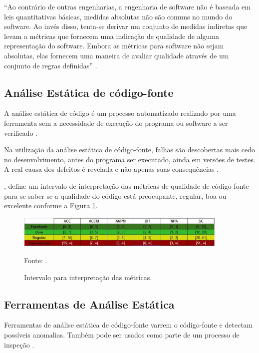 \begin{citacao}
“Ao contrário de outras engenharias, a engenharia de software não é baseada em leis quantitativas básicas, medidas absolutas não são comuns no mundo do software. Ao invés disso, tenta-se derivar um conjunto de medidas indiretas que levam a métricas que fornecem uma indicação de qualidade de alguma representação do software. Embora as métricas para software não sejam absolutas, elas fornecem uma maneira de avaliar qualidade através de um conjunto de regras definidas” \cite[pág.~5]{bueno2011}.
\end{citacao}

\subsection{Análise Estática de código-fonte}

A análise estática de código é um processo automatizado realizado por uma ferramenta sem a necessidade de execução do programa ou software a ser verificado \cite[pág.~64]{chess2007}.

Na utilização da análise estática de código-fonte, falhas são descobertas mais cedo no desenvolvimento, antes do programa ser executado, ainda em versões de testes. A real causa dos defeitos é revelada e não apenas suas consequências \cite[pág.~19]{melo2011}.

, define um intervalo de interpretação das métricas de qualidade de código-fonte para se saber se a qualidade do código está preocupante, regular, boa ou excelente conforme a Figura \ref{intervalosMetricas}.

\begin{figure}[H]
\centering
\includegraphics[width=0.9\textwidth]{figuras/intervalosMetricas}
\caption{Intervalo para interpretação das métricas.}{Fonte: .} 
\label{intervalosMetricas}
\end{figure}

\subsection{Ferramentas de Análise Estática}

Ferramentas de análise estática de código-fonte varrem o código-fonte e detectam possíveis anomalias. Também pode ser usados como parte de um processo de inspeção \cite[pág.~345]{sommerville}.

